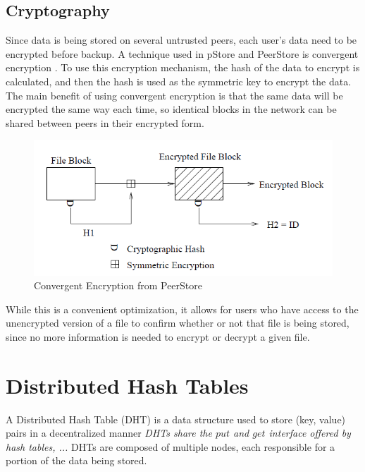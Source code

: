\documentclass[12pt]{report}
\begin{document}
\subsection{Cryptography}
Since data is being stored on several untrusted peers, each user's data need to be encrypted before backup. A technique used in pStore and PeerStore is convergent encryption \cite{pStore, PeerStore}. To use this encryption mechanism, the hash of the data to encrypt is calculated, and then the hash is used as the symmetric key to encrypt the data. The main benefit of using convergent encryption is that the same data will be encrypted the same way each time, so identical blocks in the network can be shared between peers in their encrypted form.

\begin{figure}
  \centering
  \includegraphics[scale=0.75]{ConvergentEncryption}
  \caption{Convergent Encryption from PeerStore}
\end{figure}

While this is a convenient optimization, it allows for users who have access to the unencrypted version of a file to confirm whether or not that file is being stored, since no more information is needed to encrypt or decrypt a given file.
\section{Distributed Hash Tables}

A Distributed Hash Table (DHT) is a data structure used to store (key, value) pairs in a decentralized manner \textit{DHTs share the $put$ and $get$ interface offered by hash tables, ...} DHTs are composed of multiple nodes, each responsible for a portion of the data being stored. 
\end{document}
